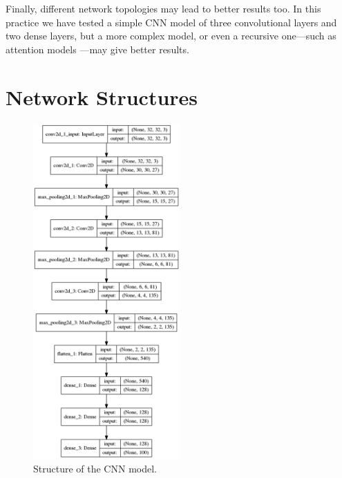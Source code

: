 \documentclass[]{article}
\begin{document}
Finally, different network topologies may lead to better results too. In this practice we have tested a simple CNN model of three convolutional layers and two dense layers, but a more complex model, or even a recursive one---such as attention models \cite{itti1998model}---may give better results.

{}


\pagebreak

\appendix

\section{Network Structures}

\begin{figure}[H]
	\centering
	\includegraphics[width=0.5\textwidth]{baseline}
	\caption{Structure of the CNN model.}
	\label{f:baseline}
\end{figure}
\end{document}
